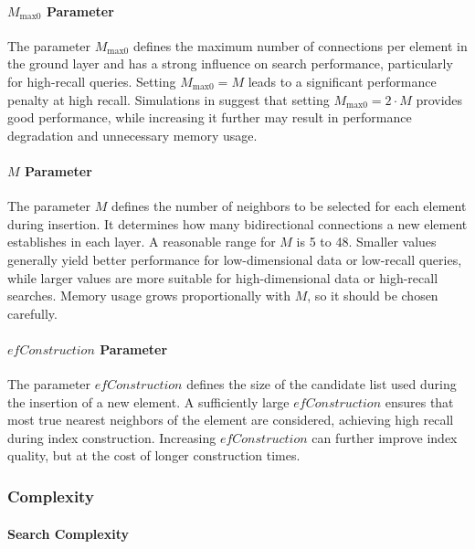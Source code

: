 \paragraph{$M_{\text{max0}}$ Parameter}

The parameter $M_{\text{max0}}$ defines the maximum number of connections per element in the ground layer and has a strong influence on search performance, particularly for high-recall queries. Setting $M_{\text{max0}} = M$ leads to a significant performance penalty at high recall. Simulations in \cite{Malkov-Yashunin-2016} suggest that setting $M_{\text{max0}} = 2 \cdot M$ provides good performance, while increasing it further may result in performance degradation and unnecessary memory usage.

\paragraph{$M$ Parameter}

The parameter $M$ defines the number of neighbors to be selected for each element during insertion. It determines how many bidirectional connections a new element establishes in each layer. A reasonable range for $M$ is 5 to 48. Smaller values generally yield better performance for low-dimensional data or low-recall queries, while larger values are more suitable for high-dimensional data or high-recall searches. Memory usage grows proportionally with $M$, so it should be chosen carefully.

\paragraph{$efConstruction$ Parameter}

The parameter $efConstruction$ defines the size of the candidate list used during the insertion of a new element. A sufficiently large $efConstruction$ ensures that most true nearest neighbors of the element are considered, achieving high recall during index construction. Increasing $efConstruction$ can further improve index quality, but at the cost of longer construction times.

\subsubsection{Complexity}

\paragraph{Search Complexity}

